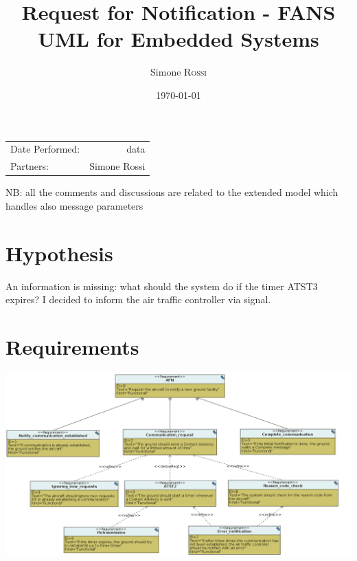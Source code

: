 \documentclass{article}
\title{Request for Notification - FANS\\ UML for Embedded Systems} %
\author{Simone \textsc{Rossi}} %
\date{\today} %
\begin{document}
\maketitle %

\begin{center}
\begin{tabular}{l r}
Date Performed: & data \\ %
Partners: & Simone Rossi \\ %
\end{tabular}
\end{center}


NB: all the comments and discussions are related to the extended model which handles also 
message parameters

\section{Hypothesis}
An information is missing: what should the system do if the timer ATST3 expires? I decided to 
inform the air traffic controller via signal. 

\section{Requirements}
\includegraphics[width=\textwidth]{./lab2_10.png}
\end{document}
